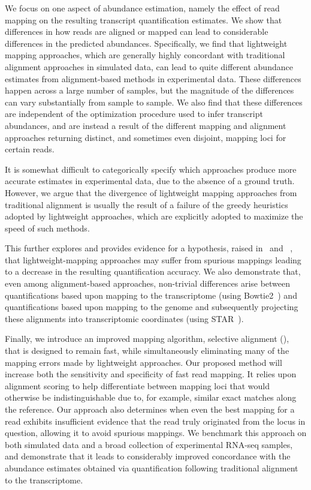 We focus on one aspect of abundance estimation, namely the
effect of read mapping on the resulting transcript quantification estimates. We
show that differences in how reads are aligned or mapped can lead to
considerable differences in the predicted abundances. Specifically, we find that
lightweight mapping approaches\citep{sailfish,kallisto,rapmap,fleximer}, which
are generally highly concordant with traditional alignment approaches in
simulated data, can lead to quite different abundance estimates from
alignment-based methods in experimental data. These differences happen
across a large number of samples, but the magnitude of the differences can vary 
substantially from sample to sample. 
We also find that these differences are independent of the optimization procedure used to
infer transcript abundances, and are instead a result of the different mapping and
alignment approaches returning distinct, and sometimes even disjoint, mapping loci
for certain reads.

It is somewhat difficult to categorically specify which approaches produce more accurate 
estimates in experimental data, due to the absence of a ground truth. However,
we argue that the divergence of lightweight mapping approaches from traditional
alignment is usually the result of a failure of the greedy heuristics adopted by
lightweight approaches, which are explicitly adopted to maximize the speed of
such methods.

This further explores and provides evidence for a hypothesis, raised
in~\citet{selaln} and ~\citet{heraem}, that lightweight-mapping approaches may suffer from
spurious mappings leading to a decrease in the resulting quantification
accuracy. We also demonstrate that, even among alignment-based approaches,
non-trivial differences arise between quantifications based upon mapping to the
transcriptome (using Bowtie2~\citep{bowtie2}) and quantifications based upon
mapping to the genome and subsequently projecting these alignments into
transcriptomic coordinates (using STAR~\citep{star}).

Finally, we introduce an improved mapping algorithm, selective alignment (\hsa),
that is designed to remain fast, while simultaneously eliminating many of the
mapping errors made by lightweight approaches. Our proposed method will increase
both the sensitivity and specificity of fast read mapping. It relies upon
alignment scoring to help differentiate between mapping loci that would
otherwise be indistinguishable due to, for example, similar exact matches along
the reference. Our approach also determines when even the best mapping for a
read exhibits insufficient evidence that the read truly originated from the
locus in question, allowing it to avoid spurious mappings. We benchmark this
approach on both simulated data and a broad collection of experimental
RNA-seq samples, and demonstrate that it leads to considerably improved
concordance with the abundance estimates obtained via quantification following
traditional alignment to the transcriptome.

